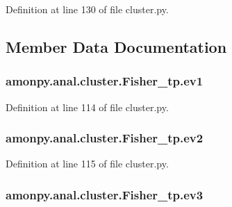 Definition at line 130 of file cluster.\-py.



\subsection{Member Data Documentation}
\hypertarget{classamonpy_1_1anal_1_1cluster_1_1_fisher__tp_a4b282e58dde2fdfc1c815e6f6d2fba5f}{
\subsubsection[{ev1}]{\setlength{\rightskip}{0pt plus 5cm}amonpy.\-anal.\-cluster.\-Fisher\-\_\-tp.\-ev1}}\label{classamonpy_1_1anal_1_1cluster_1_1_fisher__tp_a4b282e58dde2fdfc1c815e6f6d2fba5f}


Definition at line 114 of file cluster.\-py.

\hypertarget{classamonpy_1_1anal_1_1cluster_1_1_fisher__tp_a5aad4ba062a0103b45387fea062e00f9}{
\subsubsection[{ev2}]{\setlength{\rightskip}{0pt plus 5cm}amonpy.\-anal.\-cluster.\-Fisher\-\_\-tp.\-ev2}}\label{classamonpy_1_1anal_1_1cluster_1_1_fisher__tp_a5aad4ba062a0103b45387fea062e00f9}


Definition at line 115 of file cluster.\-py.

\hypertarget{classamonpy_1_1anal_1_1cluster_1_1_fisher__tp_a222ee1411c4db3f384af8421292f2ec1}{
\subsubsection[{ev3}]{\setlength{\rightskip}{0pt plus 5cm}amonpy.\-anal.\-cluster.\-Fisher\-\_\-tp.\-ev3}}\label{classamonpy_1_1anal_1_1cluster_1_1_fisher__tp_a222ee1411c4db3f384af8421292f2ec1}



